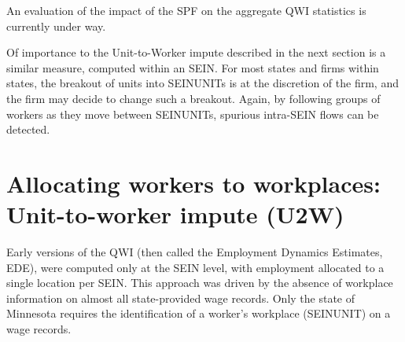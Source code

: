 An evaluation of the impact of the SPF on the aggregate QWI statistics is
currently under way.

Of importance to the Unit-to-Worker impute described in the next section is
a similar measure, computed within an SEIN. For most states and firms within
states, the breakout of units into SEINUNITs is  at the discretion
of the firm, and the firm may decide to change such a breakout. Again, by
following groups of workers as they move between SEINUNITs, spurious
intra-SEIN flows can be detected. 


\section{Allocating workers to workplaces: Unit-to-worker impute (U2W)}
\label{sec:u2w}


Early versions of the QWI (then
called the Employment Dynamics Estimates, EDE), were computed only at the SEIN
level, with employment allocated to a single location per SEIN. This
approach was driven by the absence of workplace information on almost all
state-provided wage records. Only the state of Minnesota requires the
identification of a worker's workplace (SEINUNIT) on a wage records. 


%



